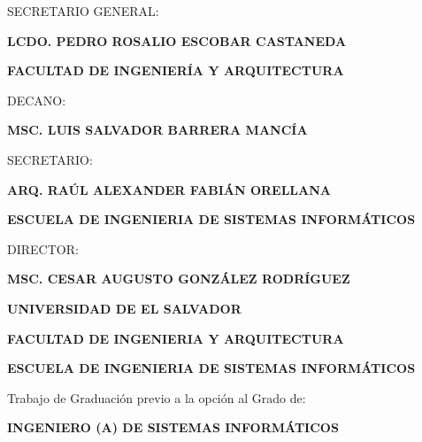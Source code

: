 \documentclass[12pt,letterpaper]{report}
\begin{document}
\noindent \small SECRETARIO GENERAL:
\begin{center}
{\normalsize\bfseries LCDO. PEDRO ROSALIO ESCOBAR CASTANEDA\par}
\end{center}
\vspace{1.0cm}

\begin{center}
{\normalsize\bfseries FACULTAD DE INGENIER\'IA Y ARQUITECTURA\par}
\end{center}
\vspace{0.6cm}

\noindent \small DECANO:
\begin{center}
{\normalsize\bfseries MSC. LUIS SALVADOR BARRERA MANC\'IA\par}
\end{center}
\vspace{0.6cm}

\noindent \small SECRETARIO:
\begin{center}
{\normalsize\bfseries ARQ. RA\'UL ALEXANDER FABI\'AN ORELLANA\par}
\end{center}
\vspace{1.0cm}

\begin{center}
{\normalsize\bfseries ESCUELA DE INGENIERIA DE SISTEMAS INFORM\'ATICOS\par}
\end{center}
\vspace{0.6cm}

\noindent \small DIRECTOR:
\begin{center}
{\normalsize\bfseries MSC. CESAR AUGUSTO GONZ\'ALEZ RODR\'IGUEZ\par}
\end{center}

\newpage
\thispagestyle{empty}
\begin{center}
{\normalsize\bfseries UNIVERSIDAD DE EL SALVADOR\par}
\vspace{0.25cm}
{\normalsize\bfseries FACULTAD DE INGENIERIA Y ARQUITECTURA\par}
\vspace{0.25cm}
{\normalsize\bfseries ESCUELA DE INGENIERIA DE SISTEMAS INFORM\'ATICOS\par}
\vspace{0.6cm}
{\small Trabajo de Graduaci\'on previo a la opci\'on al Grado de:\par}
\vspace{0.2cm}
{\normalsize\bfseries INGENIERO (A) DE SISTEMAS INFORM\'ATICOS\par}
\end{center}
\vspace{0.5cm}
\end{document}
